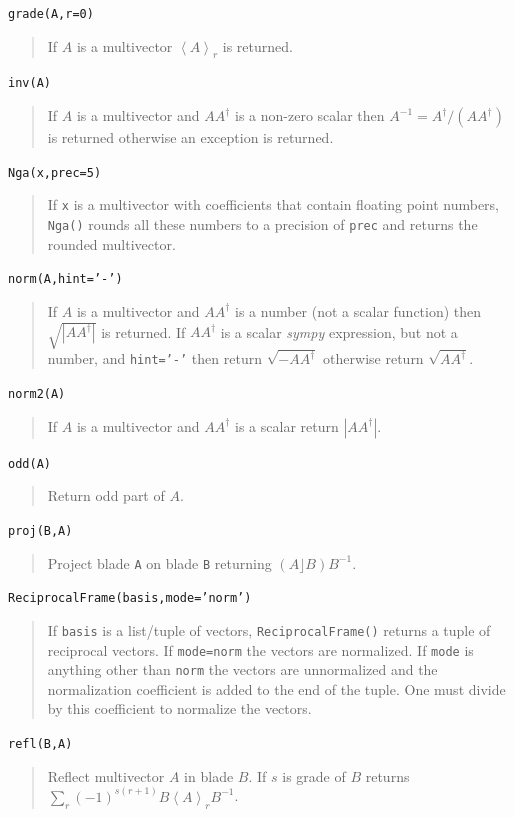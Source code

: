 \documentclass[12pt]{report}
\newcommand{\lp}{\left (}
\newcommand{\rp}{\right )}
\newcommand{\abs}[1]{\left |{#1}\right |}
\newcommand{\R}{\dagger}
\newcommand{\grade}[1]{\left < {#1} \right >}
\newcommand{\paren}[1]{\lp {#1} \rp}
\newcommand{\T}[1]{\texttt{#1}}
\begin{document}
\T{grade(A,r=0)}
\begin{quote}
    If $A$ is a multivector $\grade{A}_{r}$ is returned.
\end{quote}

\T{inv(A)}
\begin{quote}
   If $A$ is a multivector and $AA^{\R}$ is a non-zero scalar then $A^{-1} = A^{\R}/(AA^{\R})$ is returned
   otherwise an exception is returned.
\end{quote}

\T{Nga(x,prec=5)}
\begin{quote}
   If \T{x} is a multivector with coefficients that contain floating point numbers, \T{Nga()}
   rounds all these numbers to a precision of \T{prec} and returns the rounded multivector.
\end{quote}

\T{norm(A,hint='-')}
\begin{quote}
    If $A$ is a multivector and $AA^{\R}$ is a number (not a scalar function) then $\sqrt{\abs{AA^{\R}}}$ is returned.
    If $AA^{\R}$ is a scalar \emph{sympy} expression, but not a number, and \T{hint='-'} then return  $\sqrt{-AA^{\R}}$ otherwise return
    $\sqrt{AA^{\R}}$.
\end{quote}

\T{norm2(A)}
\begin{quote}
    If $A$ is a multivector and $AA^{\R}$ is a scalar return $\abs{AA^{\R}}$.
\end{quote}

\T{odd(A)}
\begin{quote}
    Return odd part of $A$.
\end{quote}

\T{proj(B,A)}
\begin{quote}
   Project blade \T{A} on blade \T{B} returning $\paren{A\rfloor B}B^{-1}$.
\end{quote}

\T{ReciprocalFrame(basis,mode='norm')}
\begin{quote}
   If \T{basis} is a list/tuple of vectors, \T{ReciprocalFrame()} returns a tuple of reciprocal
   vectors.  If \T{mode=norm} the vectors are normalized.  If \T{mode} is anything other than
   \T{norm} the vectors are unnormalized and the normalization coefficient is added to the
   end of the tuple.  One must divide by this coefficient to normalize the vectors.
\end{quote}

\T{refl(B,A)}
\begin{quote}
   Reflect multivector $A$ in blade $B$. If $s$ is grade of $B$
   returns $\sum_{r}(-1)^{s(r+1)}B\grade{A}_{r}B^{-1}$.
\end{quote}
\end{document}
